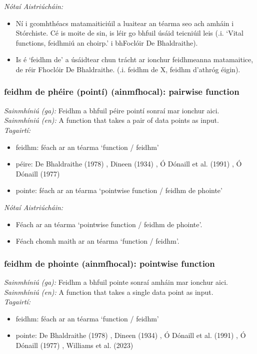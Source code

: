  \noindent \textit{Nótaí Aistriúcháin:}
\begin{itemize}
	\item Ní i gcomhthéacs matamaiticiúil a luaitear an téarma seo ach amháin i Stórchiste. Cé is moite de sin, is léir go bhfuil úsáid teicniúil leis (.i. `Vital functions, feidhmiú an choirp.' i bhFoclóir De Bhaldraithe).
	\item Is é `feidhm de' a úsáidtear chun trácht ar ionchur feidhmeanna matamaitice, de réir Fhoclóir De Bhaldraithe. (.i. feidhm de X, feidhm d'athróg éigin).
\end{itemize}


\subsubsection*{feidhm de phéire (pointí) (ainmfhocal): pairwise function}
 \noindent \textit{Sainmhíniú (ga):} Feidhm a bhfuil péire pointí sonraí mar ionchur aici.
\\
 \noindent \textit{Sainmhíniú (en):} A function that takes a pair of data points as input.
\\
 \noindent \textit{Tagairtí:}
\begin{itemize}
	\item feidhm: féach ar an téarma `function / feidhm'
	\item péire: De Bhaldraithe (1978) \cite{de-bhaldraithe}, Dineen (1934) \cite{dineen}, Ó Dónaill et al. (1991) \cite{focloir-beag}, Ó Dónaill (1977) \cite{odonaill}
	\item pointe: féach ar an téarma `pointwise function / feidhm de phointe'
\end{itemize}

 \noindent \textit{Nótaí Aistriúcháin:}
\begin{itemize}
	\item Féach ar an téarma `pointwise function / feidhm de phointe'.
	\item Féach chomh maith ar an téarma `function / feidhm'.
\end{itemize}


\subsubsection*{feidhm de phointe (ainmfhocal): pointwise function}
 \noindent \textit{Sainmhíniú (ga):} Feidhm a bhfuil pointe sonraí amháin mar ionchur aici.
\\
 \noindent \textit{Sainmhíniú (en):} A function that takes a single data point as input.
\\
 \noindent \textit{Tagairtí:}
\begin{itemize}
	\item feidhm: féach ar an téarma `function / feidhm'
	\item pointe: De Bhaldraithe (1978) \cite{de-bhaldraithe}, Dineen (1934) \cite{dineen}, Ó Dónaill et al. (1991) \cite{focloir-beag}, Ó Dónaill (1977) \cite{odonaill}, Williams et al. (2023) \cite{storchiste}
\end{itemize}

